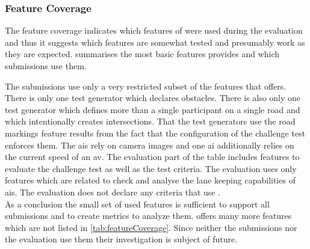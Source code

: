 \subsubsection{Feature Coverage}
The feature coverage indicates which features of \drivebuild{} were used during the evaluation and thus it suggests which features are somewhat tested and presumably work as they are expected.
 summarises the most basic features \drivebuild{} provides and which submissions use them.
\begin{table}
    \centering
    \caption{%
        Feature coverage --- Summarizes which features are used by the submissions and the evaluation.
        If a cell contains check mark a submission or the evaluation uses the feature intentionally.
        If a cell contains a tilde the feature is used only sometimes and the submission is not explicitly designed to use it.
    }\label{tab:featureCoverage}
    \medskip
    
\end{table}
The submissions use only a very restricted subset of the features that \drivebuild{} offers.
There is only one test generator which declares obstacles.
There is also only one test generator which defines more than a single participant on a single road and which intentionally creates intersections.
That the test generators use the road markings feature results from the fact that the configuration of the challenge test enforces them.
The \glspl{ai} rely on camera images and one \gls{ai} additionally relies on the current speed of an \gls{av}.
The evaluation part of the table includes features to evaluate the challenge test as well as the test criteria.
The evaluation uses only features which are related to check and analyse the lane keeping capabilities of \glspl{ai}.
The evaluation does not declare any criteria that use .\\
As a conclusion the small set of used features is sufficient to support all submissions and to create metrics to analyze them.
\drivebuild{} offers many more features which are not listed in \cref{tab:featureCoverage}.
Since neither the submissions nor the evaluation use them their investigation is subject of future.
